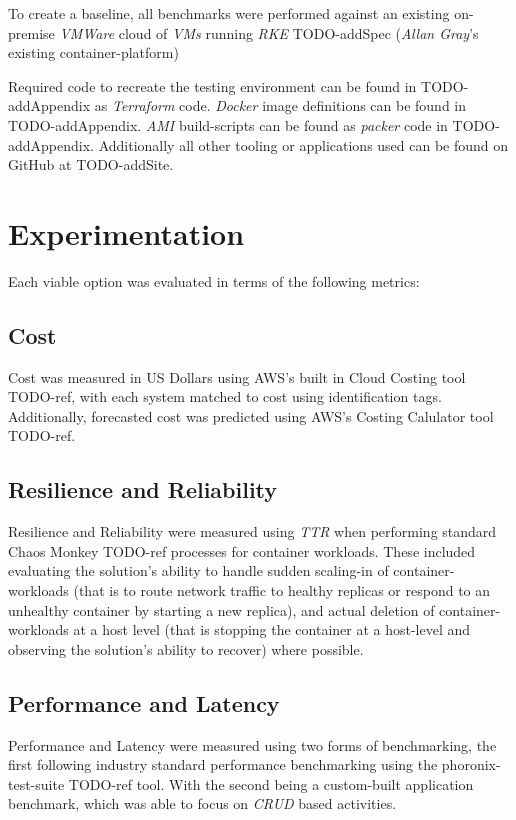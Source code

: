 To create a baseline, all benchmarks were performed against an existing on-premise \emph{VMWare} cloud of \emph{VMs} running \emph{RKE} TODO-addSpec (\emph{Allan Gray}'s existing container-platform)


Required code to recreate the testing environment can be found in TODO-addAppendix as \emph{Terraform} code.
\emph{Docker} image definitions can be found in TODO-addAppendix.
\emph{AMI} build-scripts can be found as \emph{packer} code in TODO-addAppendix.
Additionally all other tooling or applications used can be found on GitHub at TODO-addSite.

\chapter{Experimentation}

Each viable option was evaluated in terms of the following metrics:
\section{Cost}
Cost was measured in US Dollars using AWS's built in Cloud Costing tool TODO-ref, with each system matched to cost using identification tags.
Additionally, forecasted cost was predicted using AWS's Costing Calulator tool TODO-ref.

\section{Resilience and Reliability}
Resilience and Reliability were measured using \textit{TTR} when performing standard Chaos Monkey TODO-ref processes for container workloads.
These included evaluating the solution's ability to handle sudden scaling-in of container-workloads (that is to route network traffic to healthy replicas or respond to an unhealthy container by starting a new replica),
and actual deletion of container-workloads at a host level (that is stopping the container at a host-level and observing the solution's ability to recover) where possible.

\section{Performance and Latency}
Performance and Latency were measured using two forms of benchmarking, the first following industry standard performance benchmarking using the phoronix-test-suite TODO-ref tool.
With the second being a custom-built application benchmark, which was able to focus on \emph{CRUD} based activities.



